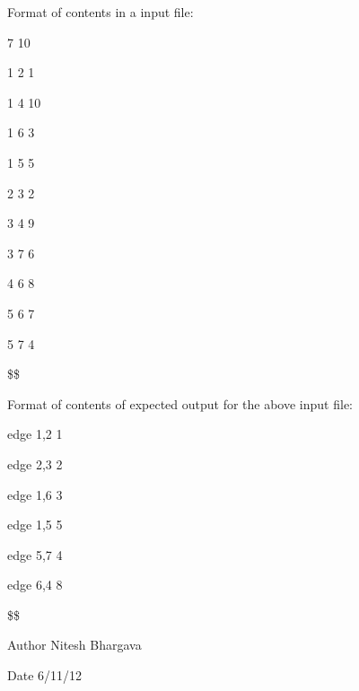 \begin{DoxyParagraph}{Format of contents in a input file\-:}

\begin{DoxyItemize}
\item 7 10
\item 1 2 1
\item 1 4 10
\item 1 6 3
\item 1 5 5
\item 2 3 2
\item 3 4 9
\item 3 7 6
\item 4 6 8
\item 5 6 7
\item 5 7 4
\item \$\$
\end{DoxyItemize}
\end{DoxyParagraph}
\begin{DoxyParagraph}{Format of contents of expected output for the above input file\-:}

\begin{DoxyItemize}
\item edge 1,2 1
\item edge 2,3 2
\item edge 1,6 3
\item edge 1,5 5
\item edge 5,7 4
\item edge 6,4 8
\item \$\$
\end{DoxyItemize}
\end{DoxyParagraph}
\begin{DoxyAuthor}{Author}
Nitesh Bhargava 
\end{DoxyAuthor}
\begin{DoxyDate}{Date}
6/11/12 
\end{DoxyDate}
